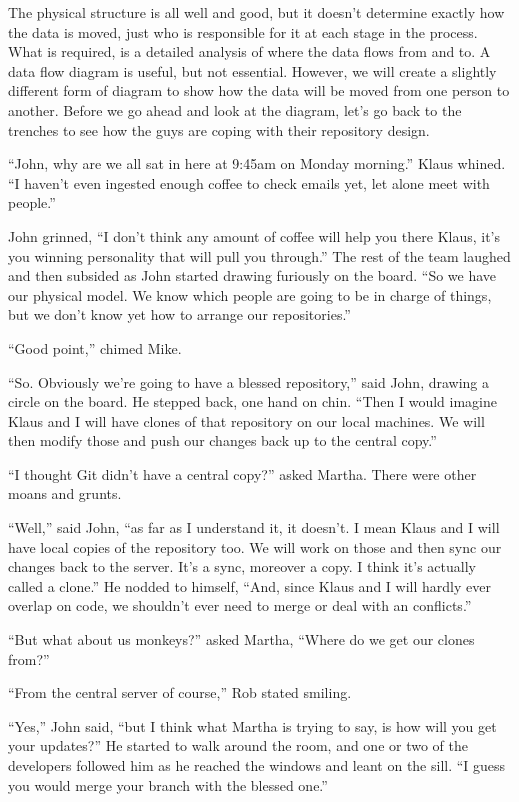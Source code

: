 The physical structure is all well and good, but it doesn't determine exactly how the data is moved, just who is responsible for it at each stage in the process.  What is required, is a detailed analysis of where the data flows from and to.  A data flow diagram is useful, but not essential.  However, we will create a slightly different form of diagram to show how the data will be moved from one person to another.  Before we go ahead and look at the diagram, let's go back to the trenches to see how the guys are coping with their repository design. 

\begin{trenches}
``John, why are we all sat in here at 9:45am on Monday morning.''  Klaus whined.  ``I haven't even ingested enough coffee to check emails yet, let alone meet with people.''

John grinned, ``I don't think any amount of coffee will help you there Klaus, it's you winning personality that will pull you through.''  The rest of the team laughed and then subsided as John started drawing furiously on the board.  ``So we have our physical model.  We know which people are going to be in charge of things, but we don't know yet how to arrange our repositories.''

``Good point,'' chimed Mike. 

``So.  Obviously we're going to have a blessed repository,'' said John, drawing a circle on the board.  He stepped back, one hand on chin.  ``Then I would imagine Klaus and I will have clones of that repository on our local machines.  We will then modify those and push our changes back up to the central copy.''

``I thought Git didn't have a central copy?'' asked Martha.  There were other moans and grunts. 

``Well,'' said John, ``as far as I understand it, it doesn't.  I mean Klaus and I will have local copies of the repository too.  We will work on those and then sync our changes back to the server.  It's a sync, moreover a copy.  I think it's actually called a clone.''  He nodded to himself, ``And, since Klaus and I will hardly ever overlap on code, we shouldn't ever need to merge or deal with an conflicts.''

``But what about us monkeys?'' asked Martha, ``Where do we get our clones from?''

``From the central server of course,'' Rob stated smiling. 

``Yes,'' John said, ``but I think what Martha is trying to say, is how will you get your updates?''  He started to walk around the room, and one or two of the developers followed him as he reached the windows and leant on the sill.  ``I guess you would merge your branch with the blessed one.''


\end{trenches}
